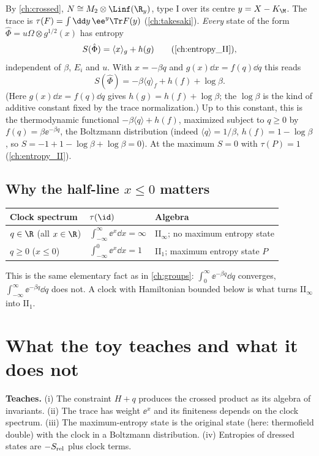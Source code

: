 By \cref{ch:crossed}, $N\cong M_2\otimes\Linf(\R_y)$, type I over its centre $y=X-K_\M$. The trace is $\tau(F)=\int\dd y\,\ee^{y}\Tr F(y)$ (\cref{ch:takesaki}). \emph{Every} state of the form $\hat\Phi=u\Omega\otimes g^{1/2}(x)$ has entropy
\begin{equation}
S(\hat\Phi)=\langle x\rangle_g+h(g)\qquad(\text{\cref{ch:entropy_II}}),
\end{equation}
independent of $\beta$, $E_i$ and $u$. With $x=-\beta q$ and $g(x)\dd x=f(q)\dd q$ this reads
\begin{equation}
S(\hat\Phi)=-\beta\langle q\rangle_f+h(f)+\log\beta.
\end{equation}
(Here $g(x)\dd x=f(q)\dd q$ gives $h(g)=h(f)+\log\beta$; the $\log\beta$ is the kind of additive constant fixed by the trace normalization.) Up to this constant, this is the thermodynamic functional $-\beta\langle q\rangle+h(f)$, maximized subject to $q\ge0$ by $f(q)=\beta\ee^{-\beta q}$, the Boltzmann distribution (indeed $\langle q\rangle=1/\beta$, $h(f)=1-\log\beta$, so $S=-1+1-\log\beta+\log\beta=0$). At the maximum $S=0$ with $\tau(P)=1$ (\cref{ch:entropy_II}).

\subsection*{Why the half-line $x\le0$ matters}
\begin{center}
\renewcommand{\arraystretch}{1.3}
\begin{tabular}{@{}lll@{}}
\toprule
Clock spectrum & $\tau(\id)$ & Algebra\\
\midrule
$q\in\R$ (all $x\in\R$) & $\int_{-\infty}^\infty\ee^{x}\dd x=\infty$ & II$_\infty$; no maximum entropy state\\
$q\ge0$ ($x\le0$) & $\int_{-\infty}^0\ee^{x}\dd x=1$ & II$_1$; maximum entropy state $P$\\
\bottomrule
\end{tabular}
\end{center}
This is the same elementary fact as in \cref{ch:groups}: $\int_0^\infty\ee^{-\beta q}\dd q$ converges, $\int_{-\infty}^\infty\ee^{-\beta q}\dd q$ does not. A clock with Hamiltonian bounded below is what turns II$_\infty$ into II$_1$.

\section{What the toy teaches and what it does not}

\textbf{Teaches.}
(i) The constraint $H+q$ produces the crossed product as its algebra of invariants. (ii) The trace has weight $\ee^{x}$ and its finiteness depends on the clock spectrum. (iii) The maximum-entropy state is the original state (here: thermofield double) with the clock in a Boltzmann distribution. (iv) Entropies of dressed states are $-S_{\rm rel}$ plus clock terms.

